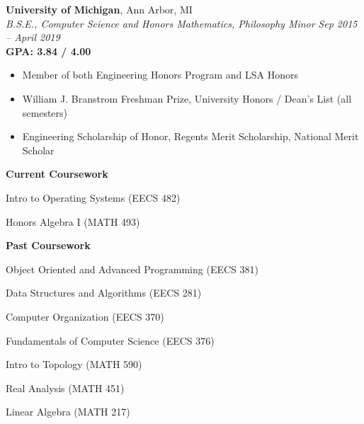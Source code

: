 \documentclass[margin,line]{resume}
\begin{document}
\begin{resume}
    \textbf{University of Michigan}, Ann Arbor, MI \\\vspace{1mm}%
    \textsl{B.S.E., Computer Science and Honors Mathematics, Philosophy Minor} \hfill \textsl{Sep 2015 -- April 2019} \\
    \textbf{GPA: 3.84 / 4.00} \\\vspace{-3.5mm}
    \begin{itemize}    
    \item Member of both Engineering Honors Program and LSA Honors
    \item William J. Branstrom Freshman Prize, University Honors / Dean's List (all semesters)
    \item Engineering Scholarship of Honor, Regents Merit Scholarship, National Merit Scholar
    \end{itemize}
    \vspace{-5.5mm}
    \begin{center} \textbf{Current Coursework} \end{center}
    \vspace{-3mm}
    \begin{itemize}
\begin{minipage}[t]{.66\linewidth}
    \item Intro to Operating Systems (EECS 482)
\end{minipage}%
\begin{minipage}[t]{.5\linewidth}
    \item Honors Algebra I (MATH 493)
\end{minipage}
\end{itemize}

\vspace{-8.5mm}
    \begin{center} \textbf{Past Coursework} \end{center}
    \vspace{-3mm}
    \begin{itemize}
    \begin{minipage}[t]{.66\linewidth}
    \item Object Oriented and Advanced Programming (EECS 381)
    \item Data Structures and Algorithms (EECS 281)
    \item Computer Organization (EECS 370)
    \item Fundamentals of Computer Science (EECS 376)
\end{minipage}%
\begin{minipage}[t]{.5\linewidth}
    \item Intro to Topology (MATH 590)
    \item Real Analysis (MATH 451)
    \item Linear Algebra (MATH 217)
\end{minipage}
\end{itemize}
\vspace{-1.5mm}


\end{resume}
\end{document}
